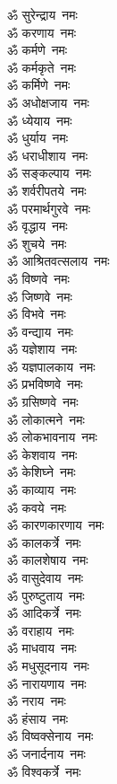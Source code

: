 \begin{multicols}{2}
\begin{flushleft}
ॐ सुरेन्द्राय~नमः\\
ॐ करणाय~नमः\\
ॐ कर्मणे~नमः\\
ॐ कर्मकृते~नमः\\
ॐ कर्मिणे~नमः\\
ॐ अधोक्षजाय~नमः\\
ॐ ध्येयाय~नमः\\
ॐ धुर्याय~नमः\\
ॐ धराधीशाय~नमः\\
ॐ सङ्कल्पाय~नमः\hfill{}\\
ॐ शर्वरीपतये~नमः\\
ॐ परमार्थगुरवे~नमः\\
ॐ वृद्धाय~नमः\\
ॐ शुचये~नमः\\
ॐ आश्रितवत्सलाय~नमः\\
ॐ विष्णवे~नमः\\
ॐ जिष्णवे~नमः\\
ॐ विभवे~नमः\\
ॐ वन्द्याय~नमः\\
ॐ यज्ञेशाय~नमः\hfill{}\\
ॐ यज्ञपालकाय~नमः\\
ॐ प्रभविष्णवे~नमः\\
ॐ ग्रसिष्णवे~नमः\\
ॐ लोकात्मने~नमः\\
ॐ लोकभावनाय~नमः\\
ॐ केशवाय~नमः\\
ॐ केशिघ्ने~नमः\\
ॐ काव्याय~नमः\\
ॐ कवये~नमः\\
ॐ कारणकारणाय~नमः\hfill{}\\
ॐ कालकर्त्रे~नमः\\
ॐ कालशेषाय~नमः\\
ॐ वासुदेवाय~नमः\\
ॐ पुरुष्टुताय~नमः\\
ॐ आदिकर्त्रे~नमः\\
ॐ वराहाय~नमः\\
ॐ माधवाय~नमः\\
ॐ मधुसूदनाय~नमः\\
ॐ नारायणाय~नमः\\
ॐ नराय~नमः\hfill{}\\
ॐ हंसाय~नमः\\
ॐ विष्वक्सेनाय~नमः\\
ॐ जनार्दनाय~नमः\\
ॐ विश्वकर्त्रे~नमः\\

\end{flushleft}
\end{multicols}
